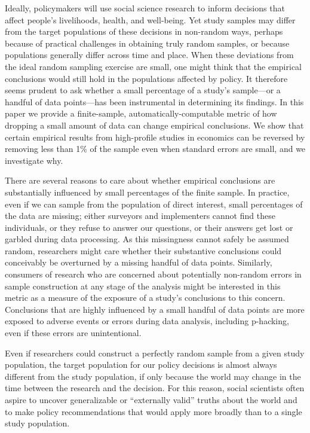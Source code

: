 Ideally, policymakers will use social science research to inform decisions that
affect people's livelihoods, health, and well-being. Yet study samples may
differ from the target populations of these decisions in non-random ways,
perhaps because of practical challenges in obtaining truly random samples, or
because populations generally differ across time and place. When these
deviations from the ideal random sampling exercise are small, one might think
that the empirical conclusions would still hold in the populations affected by
policy. It therefore seems prudent to ask whether a small percentage of a
study's sample---or a handful of data points---has been instrumental in
determining its findings. In this paper we provide a finite-sample,
automatically-computable metric of how dropping a small amount of data can
change empirical conclusions. We show that certain empirical results from
high-profile studies in economics can be reversed by removing less than 1\% of
the sample even when standard errors are small, and we investigate why.

There are several reasons to care about whether empirical conclusions are
substantially influenced by small percentages of the finite sample. In practice,
even if we can sample from the population of direct interest, small percentages
of the data are missing; either surveyors and implementers cannot find these
individuals, or they refuse to answer our questions, or their answers get lost
or garbled during data processing. As this missingness cannot safely be assumed
random, researchers might care whether their substantive conclusions could
conceivably be overturned by a missing handful of data points. Similarly,
consumers of research who are concerned about potentially non-random errors in
sample construction at any stage of the analysis might be interested in this
metric as a measure of the exposure of a study's conclusions to this concern.
Conclusions that are highly influenced by a small handful of data points are
more exposed to adverse events or errors during data analysis, including
p-hacking, even if these errors are unintentional.

Even if researchers could construct a perfectly random sample from a given study
population, the target population for our policy decisions is almost always
different from the study population, if only because the world may change in the
time between the research and the decision. For this reason, social scientists
often aspire to uncover generalizable or ``externally valid'' truths about the
world and to make policy recommendations that would apply more broadly than to a
single study population.



